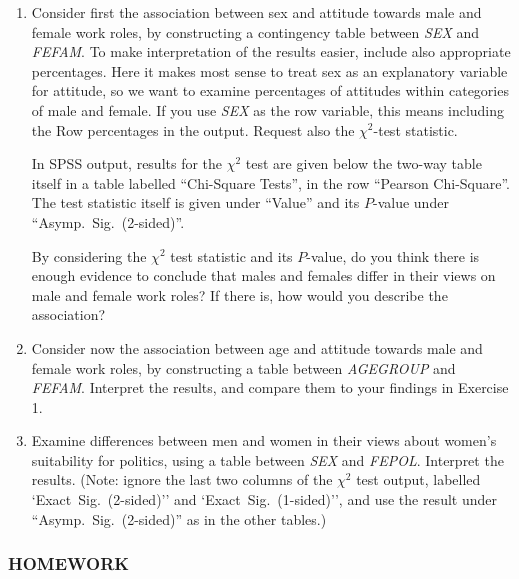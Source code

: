 \begin{enumerate}
\item
Consider first the association between sex and attitude towards
male and female work roles, by constructing a contingency table between
\emph{SEX} and \emph{FEFAM}. To make interpretation of the
results easier, include also appropriate percentages. Here it makes most
sense to treat sex as an explanatory variable for attitude, so we want
to examine percentages of attitudes within categories of male and female. If you use
\emph{SEX} as the row variable, this means including the Row
percentages in the output. Request also the $\chi^{2}$-test statistic.

In SPSS output, results for the $\chi^{2}$ test are given below the
two-way table itself in a table labelled ``Chi-Square Tests'', in the
row ``Pearson Chi-Square''. The test statistic itself is given
under ``Value'' and its $P$-value under ``Asymp.\ Sig.\ (2-sided)''.

By considering the $\chi^{2}$ test statistic and its $P$-value, do you
think there is enough evidence to conclude that males and females
differ in their views on male and female work roles?
If there is, how would you describe the association?
\item
Consider now the association between age and attitude towards
male and female work roles, by constructing a table between
\emph{AGEGROUP} and \emph{FEFAM}. Interpret the results, and compare
them to your findings in Exercise 1.
\item
Examine differences between men and women in their
views about women's suitability for politics,
using a table between
\emph{SEX} and \emph{FEPOL}. Interpret the results. (Note: ignore the
last two columns of the $\chi^{2}$ test output, labelled
`Exact\ Sig.\ (2-sided)'' and `Exact\ Sig.\ (1-sided)'', and use the
result under ``Asymp.\ Sig.\ (2-sided)'' as in the other tables.)
\end{enumerate}


\subsubsection{HOMEWORK}

